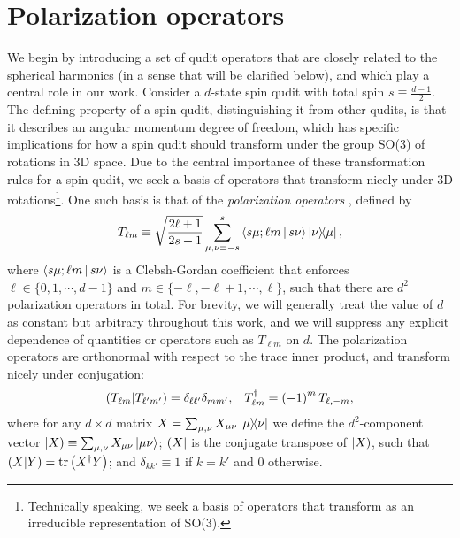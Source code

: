 \documentclass[a4paper,twocolumn,unpublished]{quantumarticle}
\newcommand{\f}[2]{\dfrac{#1}{#2}} %
\newcommand{\p}[1]{\left(#1\right)} %
\newcommand{\bk}{\Braket} %
\renewcommand{\set}[1]{\{#1\}} %
\def\obra#1{\mathinner{({#1}|}}
\def\oket#1{\mathinner{|{#1})}}
\def\obk#1{\mathinner{({#1})}}
\begin{document}

\section{Polarization operators}
\label{sec:polarization_ops}

We begin by introducing a set of qudit operators that are closely related to the spherical harmonics (in a sense that will be clarified below), and which play a central role in our work.
Consider a $d$-state spin qudit with total spin $s\equiv\frac{d-1}{2}$.
The defining property of a spin qudit, distinguishing it from other qudits, is that it describes an angular momentum degree of freedom, which has specific implications for how a spin qudit should transform under the group SO(3) of rotations in 3D space.
Due to the central importance of these transformation rules for a spin qudit, we seek a basis of operators that transform nicely under 3D rotations\footnote{Technically speaking, we seek a basis of operators that transform as an irreducible representation of SO(3).}.
One such basis is that of the {\it polarization operators} \cite{kryszewski2006positivity, bertlmann2008bloch}, defined by
\begin{align}
  T_{\ell m} \equiv \sqrt{\f{2\ell+1}{2s+1}} \sum_{\mu,\nu=-s}^s
  \bk{s\mu;\ell m|s\nu} \op{\nu}{\mu},
  \label{eq:trans_op}
\end{align}
where $\bk{s\mu;\ell m|s\nu}$ is a Clebsh-Gordan coefficient that enforces $\ell\in\set{0,1,\cdots,d-1}$ and $m\in\set{-\ell,-\ell+1,\cdots,\ell}$, such that there are $d^2$ polarization operators in total.
For brevity, we will generally treat the value of $d$ as constant but arbitrary throughout this work, and we will suppress any explicit dependence of quantities or operators such as $T_{\ell m}$ on $d$.
The polarization operators are orthonormal with respect to the trace inner product, and transform nicely under conjugation:
\begin{align}
  \obk{T_{\ell m }|T_{\ell'm'}}
  = \delta_{\ell\ell'} \delta_{mm'},
  &&
  T_{\ell m}^\dag = \p{-1}^m T_{\ell,-m},
\end{align}
where for any $d\times d$ matrix $X=\sum_{\mu,\nu} X_{\mu\nu} \op{\mu}{\nu}$ we define the $d^2$-component vector $\oket{X} \equiv \sum_{\mu,\nu} X_{\mu\nu} \ket{\mu\nu}$; $\obra{X}$ is the conjugate transpose of $\oket{X}$, such that $\obk{X|Y}=\tr\p{X^\dag Y}$; and $\delta_{kk'}\equiv 1$ if $k=k'$ and $0$ otherwise.
\end{document}
